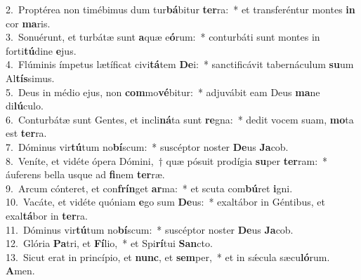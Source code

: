 {2.~}Proptérea non timébimus dum tur\textbf{bá}bitur \textbf{ter}ra:~* et transferéntur montes \textbf{in} cor \textbf{ma}ris.\\
{3.~}Sonuérunt, et turbátæ sunt \textbf{a}quæ e\textbf{ó}rum:~* conturbáti sunt montes in forti\textbf{tú}dine \textbf{e}jus.\\
{4.~}Flúminis ímpetus lætíficat civi\textbf{tá}tem \textbf{De}i:~* sanctificávit tabernáculum \textbf{su}um Al\textbf{tís}simus.\\
{5.~}Deus in médio ejus, non \textbf{com}mo\textbf{vé}bitur:~* adjuvábit eam Deus \textbf{ma}ne di\textbf{lú}culo.\\
{6.~}Conturbátæ sunt Gentes, et incli\textbf{ná}ta sunt \textbf{re}gna:~* dedit vocem suam, \textbf{mo}ta est \textbf{ter}ra.\\
{7.~}Dóminus vir\textbf{tú}tum no\textbf{bí}scum:~* suscéptor noster \textbf{De}us \textbf{Ja}cob.\\
{8.~}Veníte, et vidéte ópera Dómini,~† quæ pósuit prodígia \textbf{su}per \textbf{ter}ram:~* áuferens bella usque ad \textbf{fi}nem \textbf{ter}ræ.\\
{9.~}Arcum cónteret, et con\textbf{frín}get \textbf{ar}ma:~* et scuta com\textbf{bú}ret \textbf{i}gni.\\
{10.~}Vacáte, et vidéte quóniam \textbf{e}go sum \textbf{De}us:~* exaltábor in Géntibus, et exal\textbf{tá}bor in \textbf{ter}ra.\\
{11.~}Dóminus vir\textbf{tú}tum no\textbf{bí}scum:~* suscéptor noster \textbf{De}us \textbf{Ja}cob.\\
{12.~}Glória \textbf{Pa}tri, et \textbf{Fí}lio,~* et Spi\textbf{rí}tui \textbf{San}cto.\\
{13.~}Sicut erat in princípio, et \textbf{nunc}, et \textbf{sem}per,~* et in sǽcula sæcu\textbf{ló}rum. \textbf{A}men.\\
